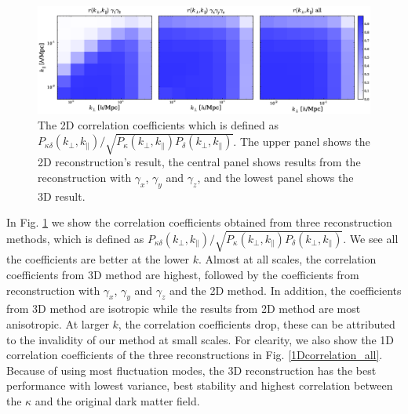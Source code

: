 \documentclass[aps,prd,twocolumn,showpacs,superscriptaddress,groupedaddress,nofootinbib]{revtex4}  %
\begin{document}
\begin{figure}[!htp]
     \centering
     \includegraphics[width=18cm]{correlation_subfigure.eps}
     \caption{The 2D correlation coefficients which is defined as $P_{\kappa\delta}(k_\perp, k_\parallel)/\sqrt{P_{\kappa}(k_\perp, k_\parallel)P_{\delta}(k_\perp, k_\parallel)}$. The upper panel shows the 2D reconstruction's result, the central panel shows results from the reconstruction with $\gamma_{x}$, $\gamma_{y}$ and $\gamma_{z}$, and the lowest panel shows the 3D result.}
     \label{2Dcorrelation}
\end{figure}


In Fig. \ref{2Dcorrelation} we show the correlation coefficients obtained from three reconstruction methods, which is defined as $P_{\kappa\delta}(k_\perp, k_\parallel)/\sqrt{P_{\kappa}(k_\perp, k_\parallel)P_{\delta}(k_\perp, k_\parallel)}$. We see all the coefficients are better at the lower $k$. Almost at all scales, the correlation coefficients from 3D method are highest, followed by the coefficients from reconstruction with $\gamma_{x}$, $\gamma_{y}$ and $\gamma_{z}$ and the 2D method. In addition, the coefficients from 3D method are isotropic while the results from 2D method are most anisotropic. At larger $k$, the correlation coefficients drop, these can be attributed to the invalidity of our method at small scales. For clearity, we also show the 1D correlation coefficients of the three reconstructions in Fig. \ref{1Dcorrelation_all}. Because of using most fluctuation modes, the 3D reconstruction has the best performance with lowest variance, best stability and highest correlation between the $\kappa$ and the original dark matter field. 
\end{document}
